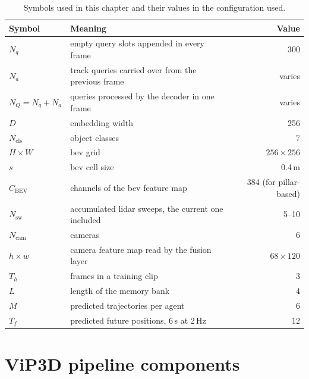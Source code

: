 \begin{table}[htbp]
    \centering
    \caption{Symbols used in this chapter and their values in the configuration used.}
    \label{tab:design-notation}
    \begin{tabular}{llr}
        \toprule
        Symbol & Meaning & Value \\
        \midrule
        $N_q$ & empty query slots appended in every frame & 300 \\
        $N_a$ & track queries carried over from the previous frame & varies \\
        $N_Q = N_q + N_a$ & queries processed by the decoder in one frame & varies \\
        $D$ & embedding width & 256 \\
        $N_{\mathrm{cls}}$ & object classes & 7 \\
        $H \times W$ & \ac{bev} grid & $256 \times 256$ \\
        $s$ & \ac{bev} cell size & 0.4\,m \\
        $C_{\mathrm{BEV}}$ & channels of the \ac{bev} feature map & 384 (for pillar-based) \\
        $N_{\mathrm{sw}}$ & accumulated \ac{lidar} sweeps, the current one included & 5--10 \\
        $N_{\mathrm{cam}}$ & cameras & 6 \\
        $h \times w$ & camera feature map read by the fusion layer & $68 \times 120$ \\
        $T_h$ & frames in a training clip & 3 \\
        $L$ & length of the memory bank & 4 \\
        $M$ & predicted trajectories per agent & 6 \\
        $T_f$ & predicted future positions, 6\,s at 2\,Hz & 12 \\
        \bottomrule
    \end{tabular}
\end{table}


\section{ViP3D pipeline components}
\label{sec:design-vip3d}

